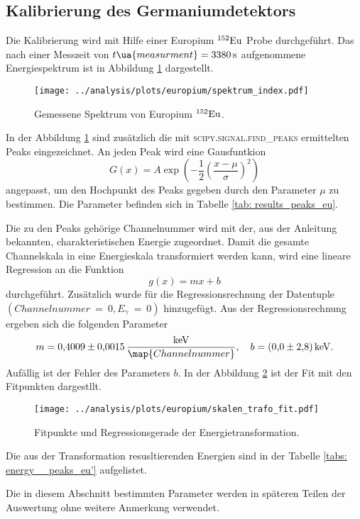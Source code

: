 \subsection{Kalibrierung des Germaniumdetektors}
\FloatBarrier
Die Kalibrierung wird mit Hilfe einer Europium $^{152}\ce{Eu}$ Probe
durchgeführt. Das nach einer Messzeit von $t\ua{measurment}=\SI{3380}{\second}$
aufgenommene Energiespektrum ist in Abbildung \ref{fig:spectrum_europ} dargestellt.
\begin{figure}
  \centering
  \texttt{[image: ../analysis/plots/europium/spektrum\_index.pdf]}
  \caption{Gemessene Spektrum von Europium $^{152}\ce{Eu}$.}
  \label{fig:spectrum_europ}
\end{figure}
In der Abbildung \ref{fig:spectrum_europ} sind zusätzlich die mit
\textsc{scipy.signal.find\_{peaks}} ermittelten Peaks eingezeichnet.
An jeden Peak wird eine Gausfuntkion
\begin{equation}
  \label{eq:gaus}
  G(x)=A\exp{\left(-\frac{1}{2}\left(\frac{x-\mu}{\sigma}\right)^2\right)}
\end{equation}
angepasst, um den Hochpunkt des Peaks gegeben durch den Parameter $\mu$ zu
bestimmen. Die Parameter befinden sich in Tabelle \ref{tab: results_peaks_eu}.

Die zu den Peaks gehörige Channelnummer wird mit der, aus der Anleitung \cite{anleitungV18}
bekannten, charakteristischen Energie zugeordnet.
Damit die gesamte Channelskala in eine Energieskala transformiert werden kann,
wird eine lineare Regression an die Funktion
\begin{equation*}
  g(x)=mx+b
\end{equation*}
durchgeführt. Zusätzlich wurde für die Regressionsrechnung der Datentuple\newline
$(Channelnummer~=~0,E_\gamma~=~0)$ hinzugefügt.
 Aus der Regressionsrechnung ergeben sich die folgenden Parameter
\begin{equation}
  \label{eq:channel_energie_trafo}
  m=\num{0.4009\pm0.0015}\,\frac{\si{\kilo\eV}}{\map{Channelnummer}}, \quad b=\SI{0.0\pm2.8}{\kilo\eV}.
\end{equation}
Aufällig ist der Fehler des Parameters $b$.
In der Abbildung \ref{fig:skalen_trafo_fit} ist der Fit mit den Fitpunkten dargestllt.
\begin{figure}
  \centering
  \texttt{[image: ../analysis/plots/europium/skalen\_trafo\_fit.pdf]}
  \caption{Fitpunkte und Regressionsgerade der Energietransformation.}
  \label{fig:skalen_trafo_fit}
\end{figure}
Die aus der Transformation resusltierenden Energien sind in der Tabelle \ref{tabs: energy__peaks_eu'}
aufgelistet.

Die in diesem Abschnitt bestimmten Parameter werden in späteren Teilen der Auswertung
ohne weitere Anmerkung verwendet.
\FloatBarrier

